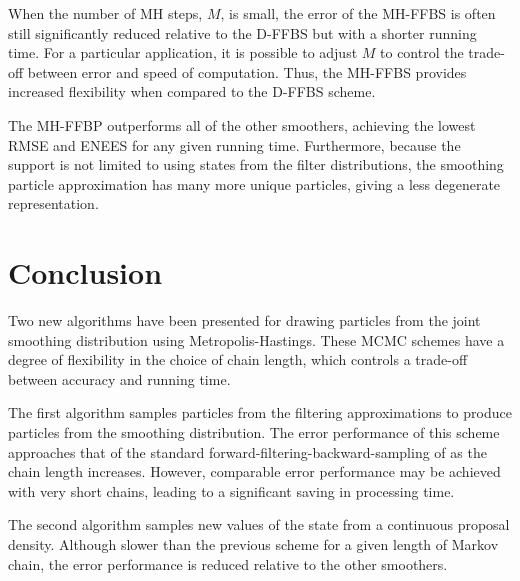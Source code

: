 \documentclass[peerreview,11pt,draftcls,onecolumn]{IEEEtran}
\begin{document}
When the number of MH steps, $M$, is small, the error of the MH-FFBS is often still significantly reduced relative to the D-FFBS but with a shorter running time. For a particular application, it is possible to adjust $M$ to control the trade-off between error and speed of computation. Thus, the MH-FFBS provides increased flexibility when compared to the D-FFBS scheme.

The MH-FFBP outperforms all of the other smoothers, achieving the lowest RMSE and ENEES for any given running time. Furthermore, because the support is not limited to using states from the filter distributions, the smoothing particle approximation has many more unique particles, giving a less degenerate representation.



\section{Conclusion} \label{sec:conclusions}
Two new algorithms have been presented for drawing particles from the joint smoothing distribution using Metropolis-Hastings. These MCMC schemes have a degree of flexibility in the choice of chain length, which controls a trade-off between accuracy and running time.

The first algorithm samples particles from the filtering approximations to produce particles from the smoothing distribution. The error performance of this scheme approaches that of the standard forward-filtering-backward-sampling of \cite{Godsill2004} as the chain length increases. However, comparable error performance may be achieved with very short chains, leading to a significant saving in processing time.

The second algorithm samples new values of the state from a continuous proposal density. Although slower than the previous scheme for a given length of Markov chain, the error performance is reduced relative to the other smoothers.








\newpage




%
%
\end{document}
